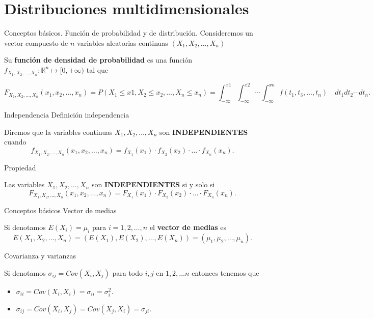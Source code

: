 \documentclass[
  ignorenonframetext,
]{beamer}
\providecommand{\tightlist}{%
  \setlength{\itemsep}{0pt}\setlength{\parskip}{0pt}}
\begin{document}
\hypertarget{distribuciones-multidimensionales}{%
\section{Distribuciones
multidimensionales}\label{distribuciones-multidimensionales}}

\begin{frame}{Conceptos básicos. Función de probabilidad y de
distribución.}
\protect\hypertarget{conceptos-buxe1sicos.-funciuxf3n-de-probabilidad-y-de-distribuciuxf3n.}{}
Consideremos un vector compuesto de \(n\) variables aleatorias continuas
\((X_1,X_2,\ldots,X_n)\)

Su \textbf{función de densidad de probabilidad} es una función
\(f_{X_1,X_2,\ldots, X_n}:\mathbb{R}^n\mapsto [0,+\infty)\) tal que

\[F_{X_1,X_2,\ldots, X_n}(x_1,x_2,\ldots,x_n)=P(X_1\leq x1,X_2\leq x_2,\ldots, X_n\leq x_n)=\int_{-\infty}^{x1}\int_{-\infty}^{x2}\cdots \int_{-\infty}^{xn} f(t_1,t_3,\ldots,t_n)\quad dt_1 dt_2\cdots dt_n.\]
\end{frame}

\begin{frame}{Independencia}
\protect\hypertarget{independencia}{}
Definición independencia

Diremos que la variables continuas \(X_1,X_2,\ldots, X_n\) son
\textbf{INDEPENDIENTES} cuando
\[f_{X_1,X_2,\ldots, X_n}(x_1,x_2,\ldots,x_n) =f_{X_1}(x_1)\cdot f_{X_2}(x_2)\cdot  \ldots \cdot  f_{X_n}(x_n).\]

Propiedad

Las variables \(X_1,X_2,\ldots, X_n\) son \textbf{INDEPENDIENTES} si y
solo si
\[F_{X_1,X_2,\ldots, X_n}(x_1,x_2,\ldots,x_n)=F_{X_1}(x_1)\cdot F_{X_2}(x_2)\cdot  \ldots \cdot  F_{X_n}(x_n).\]
\end{frame}

\begin{frame}{Conceptos básicos}
\protect\hypertarget{conceptos-buxe1sicos}{}
Vector de medias

Si denotamos \(E(X_i)=\mu_i\) para \(i=1,2,\ldots,n\) el \textbf{vector
de medias} es
\[E(X_1,X_2,\ldots,X_n)=(E(X_1),E(X_2),\ldots,E(X_n))=(\mu_1,\mu_2,\ldots,\mu_n).\]

Covarianza y varianzas

Si denotamos \(\sigma_{ij}=Cov(X_i,X_j)\) para todo \(i,j\) en
\(1,2,\ldots n\) entonces tenemos que

\begin{itemize}
\tightlist
\item
  \(\sigma_{ii}=Cov(X_i,X_i)=\sigma_{ii}=\sigma_i^2.\)
\item
  \(\sigma_{ij}=Cov(X_i,X_j)=Cov(X_j,X_i)=\sigma_{ji}.\)
\end{itemize}
\end{frame}
\end{document}
